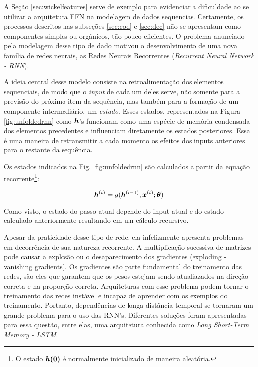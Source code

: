 A Seção \ref{sec:wickelfeatures} serve de exemplo para evidenciar a dificuldade ao se utilizar a arquitetura FFN na modelagem de dados sequencias. Certamente, os processos descritos nas subseções \ref{sec:cod} e \ref{sec:dec} não se apresentam como componentes simples ou orgânicos, tão pouco eficientes. O problema anunciado pela modelagem desse tipo de dado motivou o desenvolvimento de uma nova família de redes neurais, as Redes Neurais Recorrentes (\textit{Recurrent Neural Network - RNN}). 

A ideia central desse modelo consiste na retroalimentação dos elementos sequenciais, de modo que o \textit{input} de cada um deles serve, não somente para a previsão do próximo item da sequência, mas também para a formação de um componente intermediário, um \textit{estado}. Esses estados, representados na Figura \ref{fig:unfoldedrnn} como $\bm{h}$'s %
funcionam como uma espécie de memória condensada dos elementos precedentes e influenciam diretamente os estados posteriores. Essa é uma maneira de retransmitir a cada momento os efeitos dos inputs anteriores para o restante da sequência.

%


Os estados indicados na Fig. \ref{fig:unfoldedrnn} são calculados a partir da equação recorrente\footnote{O estado $\bm{h(0)}$ é normalmente inicializado de maneira aleatória.}:

\begin{equation}
\bm{h}^{(t)} = g(\bm{h}^{(t-1)}, \bm{x}^{(t)}; \bm{\theta})
\label{eq:rnn}
\end{equation}

Como visto, o estado do passo atual depende do input atual e do estado calculado anteriormente resultando em um cálculo recursivo.  

Apesar da praticidade desse tipo de rede, ela infelizmente apresenta problemas em decorrência de sua natureza recorrente. A multiplicação sucessiva de matrizes pode causar a explosão ou o desaparecimento dos gradientes (exploding - vanishing gradients). Os gradientes são parte fundamental do treinamento das redes, são eles que garantem que os pesos estejam sendo atualiazados na direção correta e na proporção correta. %
Arquiteturas com esse problema podem tornar o treinamento das redes instável e incapaz de aprender com os exemplos do treinamento. Portanto, dependências de longa distância temporal se tornaram um grande problema para o uso das RNN's. Diferentes soluções foram apresentadas para essa questão, entre elas, uma arquitetura conhecida como \textit{Long Short-Term Memory - LSTM}. %

